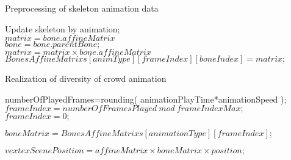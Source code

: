 \documentclass[11pt]{ctexart}
\begin{document}
  
	\begin{algorithm}  
		\caption{Preprocessing of skeleton animation data}  
		\LinesNumbered  
		
		{
			Update skeleton by animation;\\
			{
				$matrix=bone.affineMatrix$ \\
				{
					$bone=bone.parentBone;$\\
					$matrix=matrix \times bone.affineMatrix$
				}  
				$BonesAffineMatrixs[animType][frameIndex][boneIndex]=matrix;$
			} 
		}  
		
		
		
	\end{algorithm}  
	\begin{algorithm}  
		\caption{Realization of diversity of crowd animation}  
		\LinesNumbered  
{}  
		
 
				{  
					numberOfPlayedFrames=rounding(
						animationPlayTime*animationSpeed
					);
					\\
					$frameIndex=numberOfFramesPlayed \ mod \ frameIndexMax;$
				}  
				\Else  
				{  
					$frameIndex=0;$
				}  
			
			$boneMatrix = BonesAffineMatrixs[animationType][frameIndex];$
			
			
			 $vextexScenePosition =  affineMatrix \times boneMatrix \times position;$
			
	\end{algorithm}  
\end{document}
